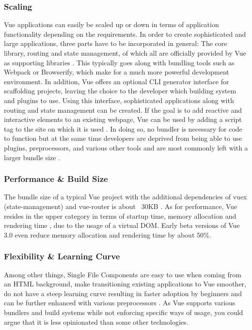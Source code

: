 \subsubsection{Scaling}
Vue applications can easily be scaled up or down in terms of application functionality depending on the requirements. In order to create sophisticated and large applications, three parts have to be incorporated in general: The core library, routing and state management, of which all are officially provided by Vue as supporting libraries \cite{ComparisonVue:online}. This typically goes along with bundling tools such as Webpack or Browserify, which make for a much more powerful development environment. In addition, Vue offers an optional CLI generator interface for scaffolding projects, leaving the choice to the developer which building system and plugins to use. Using this interface, sophisticated applications along with routing and state management can be created. If the goal is to add reactive and interactive elements to an existing webpage, Vue can be used by adding a script tag to the site on which it is used \cites{AddingReact:online, ComparisonVue:online}. In doing so, no bundler is necessary for code to function but at the same time developers are deprived from being able to use plugins, preprocessors, and various other tools and are most commonly left with a larger bundle size \cite{ComparisonVue:online}.

\subsubsection{Performance \& Build Size}
The bundle size of a typical Vue project with the additional dependencies of vuex (state-management) and vue-router is about ~30KB \cite{ComparisonVue:online}. As for performance, Vue resides in the upper category in terms of startup time, memory allocation and rendering time \cite{FrameworksPerformance:online}, due to the usage of a virtual DOM. Early beta versions of Vue 3.0 even reduce memory allocation and rendering time by about 50\%.

\subsubsection{Flexibility \& Learning Curve}
Among other things, Single File Components are easy to use when coming from an HTML background, make transitioning existing applications to Vue smoother, do not have a steep learning curve resulting in faster adoption by beginners and can be further enhanced with various preprocessors \cite{ComparisonVue:online}. As Vue supports various bundlers and build systems while not enforcing specific ways of usage, you could argue that it is less opinionated than some other technologies. 


